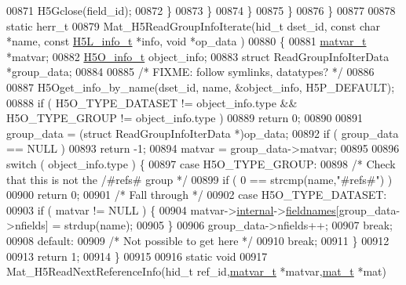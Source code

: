 \begin{DoxyCode}
00871                     H5Gclose(field\_id);
00872                 \}
00873             \}
00874         \}
00875     \}
00876 \}
00877 
00878 \textcolor{keyword}{static} herr\_t
00879 Mat\_H5ReadGroupInfoIterate(hid\_t dset\_id, \textcolor{keyword}{const} \textcolor{keywordtype}{char} *name, \textcolor{keyword}{const} \hyperlink{struct_h5_l__info__t}{H5L\_info\_t} *info, \textcolor{keywordtype}{void} *op\_data
      )
00880 \{
00881     \hyperlink{group___m_a_t_structmatvar__t}{matvar\_t}  *matvar;
00882     \hyperlink{struct_h5_o__info__t}{H5O\_info\_t} object\_info;
00883     \textcolor{keyword}{struct }ReadGroupInfoIterData *group\_data;
00884 
00885     \textcolor{comment}{/* FIXME: follow symlinks, datatypes? */}
00886 
00887     H5Oget\_info\_by\_name(dset\_id, name, &object\_info, H5P\_DEFAULT);
00888     \textcolor{keywordflow}{if} ( H5O\_TYPE\_DATASET != object\_info.type && H5O\_TYPE\_GROUP != object\_info.type )
00889         \textcolor{keywordflow}{return} 0;
00890 
00891     group\_data = (\textcolor{keyword}{struct }ReadGroupInfoIterData *)op\_data;
00892     \textcolor{keywordflow}{if} ( group\_data == NULL )
00893         \textcolor{keywordflow}{return} -1;
00894     matvar = group\_data->matvar;
00895 
00896     \textcolor{keywordflow}{switch} ( object\_info.type ) \{
00897         \textcolor{keywordflow}{case} H5O\_TYPE\_GROUP:
00898             \textcolor{comment}{/* Check that this is not the /#refs# group */}
00899             \textcolor{keywordflow}{if} ( 0 == strcmp(name,\textcolor{stringliteral}{"#refs#"}) )
00900                 \textcolor{keywordflow}{return} 0;
00901             \textcolor{comment}{/* Fall through */}
00902         \textcolor{keywordflow}{case} H5O\_TYPE\_DATASET:
00903             \textcolor{keywordflow}{if} ( matvar != NULL ) \{
00904                 matvar->\hyperlink{group___m_a_t_a6e97e3ed9f40c49322c18561c2a94e92}{internal}->\hyperlink{structmatvar__internal_a7574d000bfc98ad4860ae6590b8d4985}{fieldnames}[group\_data->nfields] = strdup(name);
00905             \}
00906             group\_data->nfields++;
00907             \textcolor{keywordflow}{break};
00908         \textcolor{keywordflow}{default}:
00909             \textcolor{comment}{/* Not possible to get here */}
00910             \textcolor{keywordflow}{break};
00911     \}
00912 
00913     \textcolor{keywordflow}{return} 1;
00914 \}
00915 
00916 \textcolor{keyword}{static} \textcolor{keywordtype}{void}
00917 Mat\_H5ReadNextReferenceInfo(hid\_t ref\_id,\hyperlink{group___m_a_t_structmatvar__t}{matvar\_t} *matvar,\hyperlink{struct__mat__t}{mat\_t} *mat)

\end{DoxyCode}
